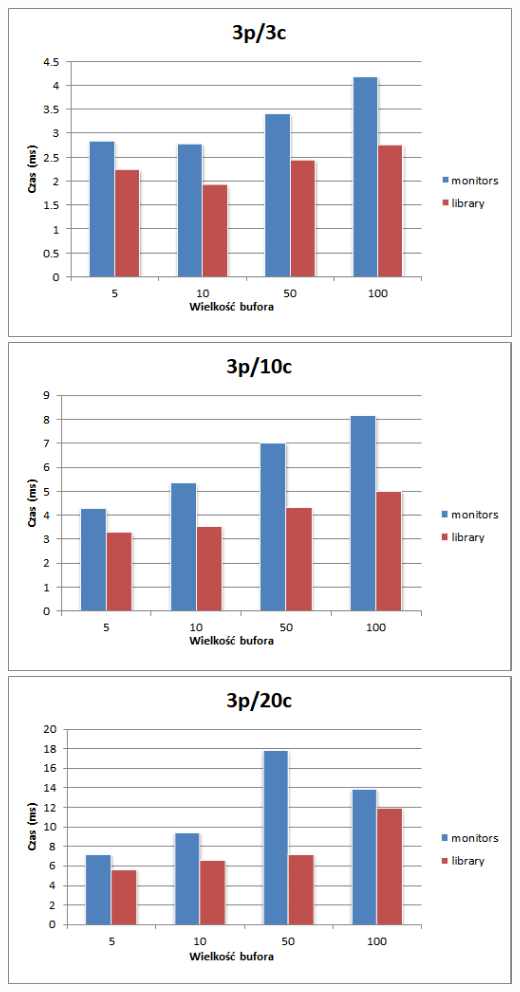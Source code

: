 \documentclass[12pt]{article}
\begin{document}
\begin{center}
\centering
    \includegraphics[width=\textwidth]{1.png}
    \includegraphics[width=\textwidth]{2.png}
    \includegraphics[width=\textwidth]{3.png}

\end{center}
\end{document}
